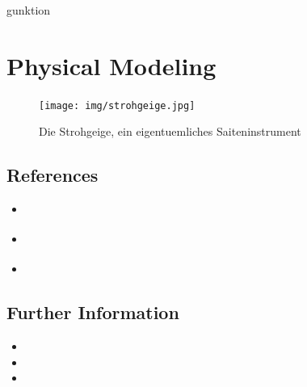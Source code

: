 gunktion
\chapter{Physical Modeling}
\label{Karplus}

\begin{figure}[h]
  \begin{center}
    \texttt{[image: img/strohgeige.jpg]}
    \caption{Die Strohgeige, ein eigentuemliches Saiteninstrument}
    \label{fig:metering}
  \end{center}
\end{figure}


\section{References}

\begin{itemize}
  \item \cite{bilbao_numerical_2009}
  \item \cite{smith_physical_2010}
  \item \cite{cook_real_2002}
\end{itemize}









\section{Further Information}

\begin{itemize}
  \item {}
  \item {}
  \item {}
\end{itemize}



